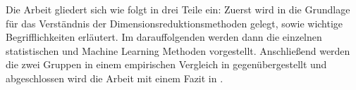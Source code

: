Die Arbeit gliedert sich wie folgt in drei Teile ein: Zuerst wird in
 die Grundlage für das Verständnis der Dimensionsreduktionsmethoden
gelegt, sowie wichtige Begrifflichkeiten erläutert. Im darauffolgenden
 werden dann die einzelnen statistischen und Machine Learning
Methoden vorgestellt. Anschließend werden die zwei Gruppen in einem empirischen Vergleich in
 gegenübergestellt und abgeschlossen wird die Arbeit mit einem Fazit in
.